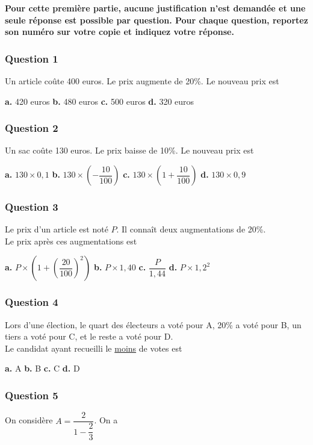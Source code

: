 \textbf{Pour cette première partie, aucune justification n'est demandée et une seule réponse est possible par question. Pour chaque question, reportez son numéro sur votre copie et indiquez votre réponse.}

\subsubsection*{Question 1}
Un article coûte 400 euros. Le prix augmente de 20\%. Le nouveau prix est

\textbf{a.} 420 euros \hfill \textbf{b.} 480 euros \hfill \textbf{c.} 500 euros \hfill \textbf{d.} 320 euros

\subsubsection*{Question 2}
Un sac coûte 130 euros. Le prix baisse de 10\%. Le nouveau prix est

\textbf{a.} $130 \times 0,1$ \hfill \textbf{b.} $130 \times \left(-\dfrac{10}{100}\right)$ \hfill \textbf{c.} $130 \times \left(1 + \dfrac{10}{100}\right)$ \hfill \textbf{d.} $130 \times 0,9$

\subsubsection*{Question 3}
Le prix d'un article est noté $P$. Il connaît deux augmentations de 20\%. \\
Le prix après ces augmentations est

\textbf{a.} $P \times \left(1 + \left(\dfrac{20}{100}\right)^2\right)$ \hfill \textbf{b.} $P \times 1,40$ \hfill \textbf{c.} $\dfrac{P}{1,44}$ \hfill \textbf{d.} $P \times 1,2^2$

\subsubsection*{Question 4}
Lors d'une élection, le quart des électeurs a voté pour A, 20\% a voté pour B, un tiers a voté pour C, et le reste a voté pour D. \\
Le candidat ayant recueilli le \underline{moins} de votes est

\textbf{a.} A \hfill \textbf{b.} B \hfill \textbf{c.} C \hfill \textbf{d.} D

\subsubsection*{Question 5}
On considère $A = \dfrac{2}{1 - \dfrac{2}{3}}$. On a

